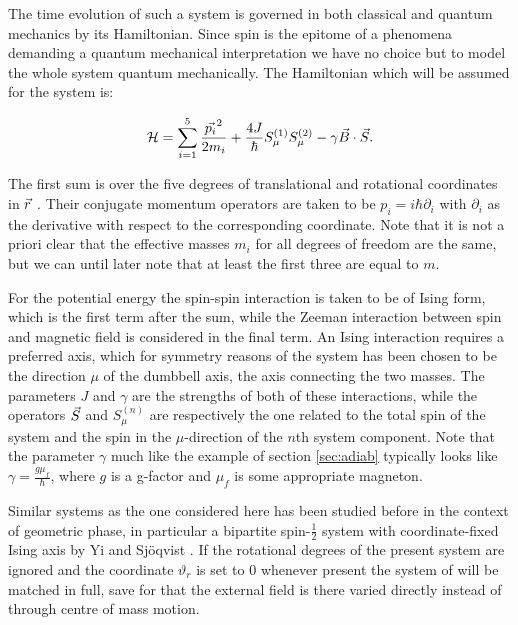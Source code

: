 \documentclass[a4paper]{article}
\begin{document}
The time evolution of such a system is governed in both classical and quantum mechanics by
its Hamiltonian. Since spin is the epitome of a phenomena demanding a quantum mechanical
interpretation we have no choice but to model the whole system quantum mechanically. %
The Hamiltonian which will be assumed for the system is:

\begin{equation}\label{eq:Hamil0}
        \mathbb{\cal H} = \sum_{i=1}^{5} \frac{\vec{p_i}^2}{2m_i} +
        \frac{4J}{\hbar{}}S^{(1)}_{\mu}S^{(2)}_{\mu} -
        \gamma\vec{B}\cdot \vec{S}.
\end{equation}

The first sum is over the five degrees of translational and rotational coordinates in \(\vec{r}\)
. Their conjugate momentum operators are
taken to be \(p_i = i\hbar \partial_i\label{def:mom}\) with \(\partial_i\) as the derivative with respect
to the
corresponding coordinate. Note that it is not a priori clear that the effective masses
\(m_i\) for
all degrees of freedom are the same, but we can until later note that at least the first
three are equal to \(m\).

For the potential energy the spin-spin interaction is taken to be of Ising form, which is
the first term after the sum, while the Zeeman interaction between spin and magnetic field is
considered in the final term. %
An Ising interaction requires a preferred axis, which for symmetry reasons
of the system has been chosen to be the direction \(\mu\) of the dumbbell axis, the axis connecting
the two masses.
 The parameters \(J\) and \(\gamma\) are the strengths of both
of these interactions, while the operators \(\vec{S}\) and \(S^{(n)}_{\mu}\) are respectively
the one
related to the total spin of the system and the spin in the \(\mu\)-direction of the \(n\)th system
component. Note that the parameter \(\gamma\) much like the example of section
\ref{sec:adiab} typically looks like \(\gamma = \frac{g\mu_f}{\hbar{}}\), where \(g\) is a
g-factor and \(\mu _f\) is some appropriate magneton.

Similar systems as the one considered here has been studied before in the context of geometric phase, in particular
a bipartite spin-\(\frac{1}{2}\) system with coordinate-fixed Ising axis by Yi and Sjöqvist
\cite{yi}. If the rotational degrees of the present system are ignored and the coordinate
\(\vartheta_r\) is set to \(0\) whenever present the system of \cite{yi} will be
matched in full, save for that the external field is there varied directly instead of
through centre of mass motion.
\end{document}
